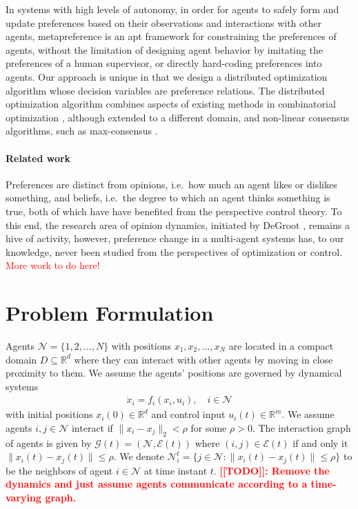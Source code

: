 \documentclass[conference]{ieeeconf}
\newcommand{\R}{\mathbb{R}}
\newcommand{\N}{\mathcal{N}}
\renewcommand{\leq}{\leqslant}
\newcommand{\graph}{\mathcal{G}}
\newcommand{\edges}{\mathcal{E}}
\begin{document}
In systems with high levels of autonomy, in order for agents to safely form and update preferences based on their observations and interactions with other agents, metapreference is an apt framework for constraining the preferences of agents, without the limitation of designing agent behavior by imitating the preferences of a human supervisor, or directly hard-coding preferences into agents. Our approach is unique in that we design a distributed optimization algorithm whose decision variables are preference relations. The distributed optimization algorithm combines aspects of existing methods in combinatorial optimization \cite{?}, although extended to a different domain, and non-linear consensus algorithms, such as max-consensus \cite{?}. 

\paragraph*{Related work}
Preferences are distinct from opinions, i.e.~how much an agent likes or dislikes something, and beliefs, i.e.~the degree to which an agent thinks something is true, both of which have have benefited from the perspective control theory. To this end, the research area of opinion dynamics, initiated by DeGroot \cite{degroot1974}, remains a hive of activity, however, preference change in a multi-agent systems has, to our knowledge, never been studied from the perspectives of optimization or control. \textcolor{red}{More work to do here!}


% 

\section{Problem Formulation}

Agents $\N = \{1,2,\dots, N\}$ with positions $x_1, x_2, \dots, x_N$ are located in a compact domain $D \subseteq \R^d$ where they can interact with other agents by moving in close proximity to them. We assume the agents' positions are governed by dynamical systems
\begin{align}
    \dot{x}_i = f_i(x_i,u_i), \quad i \in \N \label{eq:x-dynamics}
\end{align}
with initial positions $x_i(0) \in \R^d$ and control input $u_i(t) \in \R^m$. We assume agents $i, j \in \N$ interact if $\| x_i - x_j \|_2 < \rho$ for some $\rho>0$. The interaction graph of agents is given by $\graph(t) = \left( \N, \edges(t) \right)$ where $(i,j) \in \mathcal{E}(t)$ if and only it $\| x_i(t) - x_j(t) \| \leq \rho$. We denote $\N_i^t = \{ j \in \N: \| x_i(t) - x_j(t) \| \leqslant \rho \}$ to be the neighbors of agent $i \in \N$ at time instant $t$. \textcolor{red}{\bf [[TODO]]: Remove the dynamics and just assume agents communicate according to a time-varying graph.}
\end{document}
